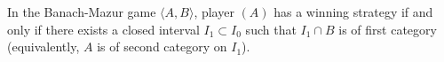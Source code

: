 In the Banach-Mazur game $\langle A, B \rangle$, player $(A)$ has a winning strategy if and only if there exists a closed interval $I_1 \subset I_0$ such that $I_1 \cap B$ is of first category (equivalently, $A$ is of second category on $I_1$).